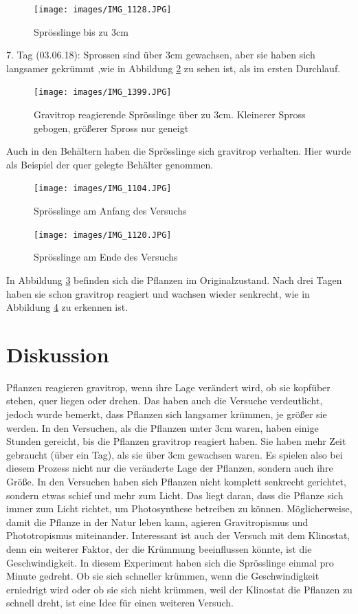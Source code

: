 \documentclass[
a4paper, 
11pt, 
ngerman,
listof=totoc,
bibliography=totocnumbered,
abstracton
]{scrreprt}
\begin{document}
\begin{figure}[H]
	\centering 
	\texttt{[image: images/IMG\_1128.JPG]}
	\caption{Sprösslinge bis zu 3cm \label{Foto 4}}
\end{figure}

7. Tag (03.06.18): Sprossen sind über 3cm gewachsen, aber sie haben sich langsamer gekrümmt ,wie in Abbildung \ref{Foto 5} zu sehen ist, als im ersten Durchlauf.

\begin{figure}[H]
	 \centering 
  \texttt{[image: images/IMG\_1399.JPG]}
  	\caption{Gravitrop reagierende Sprösslinge über zu 3cm. Kleinerer Spross gebogen, größerer Spross nur geneigt \label{Foto 5}}
\end{figure} 

 Auch in den Behältern haben die Sprösslinge sich gravitrop verhalten. Hier wurde als Beispiel der quer gelegte Behälter genommen.

\begin{figure}[H]
	\centering 
	\texttt{[image: images/IMG\_1104.JPG]}
	\caption{Sprösslinge am Anfang des Versuchs \label{Foto 6}}
\end{figure} 

\begin{figure}[H]
	\centering 
	\texttt{[image: images/IMG\_1120.JPG]}
	\caption{Sprösslinge am Ende des Versuchs \label{Foto 7}}
\end{figure} 

In Abbildung \ref{Foto 6} befinden sich die Pflanzen im Originalzustand. Nach drei Tagen haben sie schon gravitrop reagiert und wachsen wieder senkrecht, wie in Abbildung \ref{Foto 7} zu erkennen ist.

\section{Diskussion}

Pflanzen reagieren gravitrop, wenn ihre Lage verändert wird, ob sie kopfüber stehen, quer liegen oder drehen. Das haben auch die Versuche verdeutlicht, jedoch wurde bemerkt, dass Pflanzen sich langsamer krümmen, je größer sie werden. In den Versuchen, als die Pflanzen unter 3cm waren, haben einige Stunden gereicht, bis die Pflanzen gravitrop reagiert haben. Sie haben mehr Zeit gebraucht (über ein Tag), als sie über 3cm gewachsen waren. Es spielen also bei diesem Prozess nicht nur die veränderte Lage der Pflanzen, sondern auch ihre Größe. 
In den Versuchen haben sich Pflanzen nicht komplett senkrecht gerichtet, sondern etwas schief und mehr zum Licht. Das liegt daran, dass die Pflanze sich immer zum Licht richtet, um Photosynthese betreiben zu können. Möglicherweise, damit die Pflanze in der Natur leben kann, agieren Gravitropismus und Phototropismus miteinander.
Interessant ist auch der Versuch mit dem Klinostat, denn ein weiterer Faktor, der die Krümmung beeinflussen könnte, ist die Geschwindigkeit. In diesem Experiment haben sich die Sprösslinge einmal pro Minute gedreht. Ob sie sich schneller krümmen, wenn die Geschwindigkeit erniedrigt wird oder ob sie sich nicht krümmen, weil der Klinostat die Pflanzen zu schnell dreht, ist eine Idee für einen weiteren Versuch.
 
\end{document}
